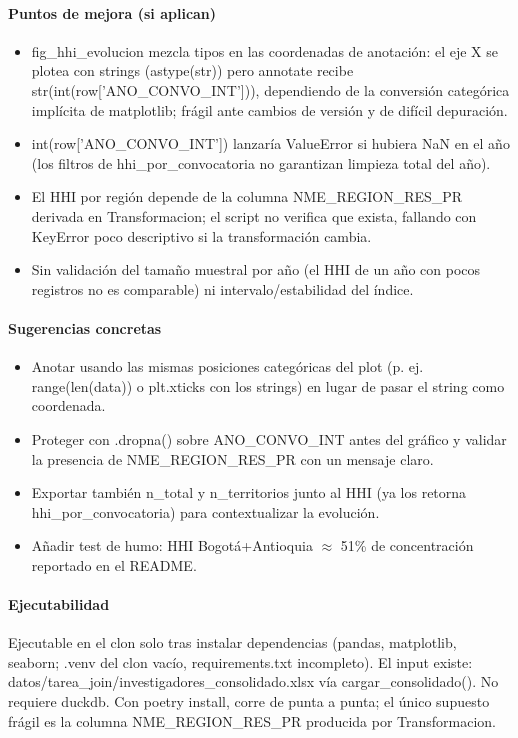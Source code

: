 \paragraph{Puntos de mejora (si aplican)}
\begin{itemize}
  \item fig\_hhi\_evolucion mezcla tipos en las coordenadas de anotación: el eje X se plotea con strings (astype(str)) pero annotate recibe str(int(row['ANO\_CONVO\_INT'])), dependiendo de la conversión categórica implícita de matplotlib; frágil ante cambios de versión y de difícil depuración.
  \item int(row['ANO\_CONVO\_INT']) lanzaría ValueError si hubiera NaN en el año (los filtros de hhi\_por\_convocatoria no garantizan limpieza total del año).
  \item El HHI por región depende de la columna NME\_REGION\_RES\_PR derivada en Transformacion; el script no verifica que exista, fallando con KeyError poco descriptivo si la transformación cambia.
  \item Sin validación del tamaño muestral por año (el HHI de un año con pocos registros no es comparable) ni intervalo/estabilidad del índice.
\end{itemize}

\paragraph{Sugerencias concretas}
\begin{itemize}
  \item Anotar usando las mismas posiciones categóricas del plot (p. ej. range(len(data)) o plt.xticks con los strings) en lugar de pasar el string como coordenada.
  \item Proteger con .dropna() sobre ANO\_CONVO\_INT antes del gráfico y validar la presencia de NME\_REGION\_RES\_PR con un mensaje claro.
  \item Exportar también n\_total y n\_territorios junto al HHI (ya los retorna hhi\_por\_convocatoria) para contextualizar la evolución.
  \item Añadir test de humo: HHI Bogotá+Antioquia $\approx$ 51\% de concentración reportado en el README.
\end{itemize}

\paragraph{Ejecutabilidad}
Ejecutable en el clon solo tras instalar dependencias (pandas, matplotlib, seaborn; .venv del clon vacío, requirements.txt incompleto). El input existe: datos/tarea\_join/investigadores\_consolidado.xlsx vía cargar\_consolidado(). No requiere duckdb. Con poetry install, corre de punta a punta; el único supuesto frágil es la columna NME\_REGION\_RES\_PR producida por Transformacion.

